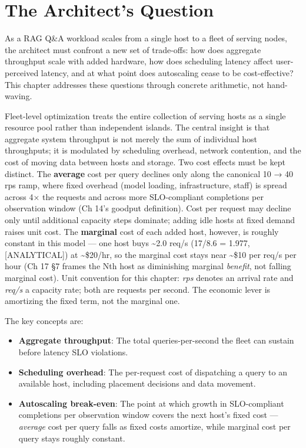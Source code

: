 \section*{The Architect's Question}\label{the-architects-question}

As a RAG Q\&A workload scales from a single host to a fleet of serving
nodes, the architect must confront a new set of trade-offs: how does
aggregate throughput scale with added hardware, how does scheduling
latency affect user-perceived latency, and at what point does
autoscaling cease to be cost-effective? This chapter addresses these
questions through concrete arithmetic, not hand-waving.

\label{concept}


Fleet-level optimization treats the entire collection of serving hosts
as a single resource pool rather than independent islands. The central
insight is that aggregate system throughput is not merely the sum of
individual host throughputs; it is modulated by scheduling overhead,
network contention, and the cost of moving data between hosts and
storage. Two cost effects must be kept distinct. The \textbf{average}
cost per query declines only along the canonical 10 → 40 rps ramp, where
fixed overhead (model loading, infrastructure, staff) is spread across
4× the requests and across more SLO-compliant completions per
observation window (Ch 14's goodput definition). Cost per request may
decline only until additional capacity steps dominate; adding idle hosts
at fixed demand raises unit cost. The \textbf{marginal} cost of each
added host, however, is roughly constant in this model --- one host buys
\textasciitilde2.0 req/s (17/8.6 = 1.977, \mbox{{[}ANALYTICAL{]}}) at
\textasciitilde\$20/hr, so the marginal cost stays near
\textasciitilde\$10 per req/s per hour (Ch 17 §7 frames the Nth host as
diminishing marginal \emph{benefit}, not falling marginal cost). Unit
convention for this chapter: \emph{rps} denotes an arrival rate and
\emph{req/s} a capacity rate; both are requests per second. The economic
lever is amortizing the fixed term, not the marginal one.


The key concepts are:

\begin{itemize}
\tightlist
\item
  \textbf{Aggregate throughput}: The total queries-per-second the fleet
  can sustain before latency SLO violations.
\item
  \textbf{Scheduling overhead}: The per-request cost of dispatching a
  query to an available host, including placement decisions and data
  movement.
\item
  \textbf{Autoscaling break-even}: The point at which growth in
  SLO-compliant completions per observation window covers the next
  host's fixed cost --- \emph{average} cost per query falls as fixed
  costs amortize, while marginal cost per query stays roughly constant.
\end{itemize}

